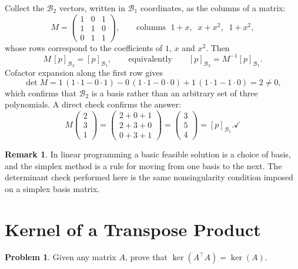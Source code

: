 \documentclass[11pt]{article}
\theoremstyle{definition}
\newtheorem{problem}{Problem}
\newtheorem*{remark}{Remark}
\begin{document}
Collect the $\mathcal{B}_2$ vectors, written in $\mathcal{B}_1$
coordinates, as the columns of a matrix:
\[
  M =
  \begin{pmatrix}
    1 & 0 & 1 \\
    1 & 1 & 0 \\
    0 & 1 & 1
  \end{pmatrix},
  \qquad
  \text{columns } \;1+x,\;\; x+x^2,\;\; 1+x^2 ,
\]
whose rows correspond to the coefficients of $1$, $x$ and $x^2$. Then
\[
  M \, [p]_{\mathcal{B}_2} = [p]_{\mathcal{B}_1},
  \qquad\text{equivalently}\qquad
  [p]_{\mathcal{B}_2} = M^{-1} [p]_{\mathcal{B}_1}.
\]
Cofactor expansion along the first row gives
\[
  \det M = 1\,(1\cdot 1 - 0\cdot 1) - 0\,(1\cdot 1 - 0\cdot 0)
         + 1\,(1\cdot 1 - 1\cdot 0) = 2 \neq 0 ,
\]
which confirms that $\mathcal{B}_2$ is a basis rather than an arbitrary
set of three polynomials. A direct check confirms the answer:
\[
  M \begin{pmatrix} 2 \\ 3 \\ 1 \end{pmatrix}
  = \begin{pmatrix} 2 + 0 + 1 \\ 2 + 3 + 0 \\ 0 + 3 + 1 \end{pmatrix}
  = \begin{pmatrix} 3 \\ 5 \\ 4 \end{pmatrix}
  = [p]_{\mathcal{B}_1}. \checkmark
\]

\begin{remark}
In linear programming a basic feasible solution is a choice of basis, and
the simplex method is a rule for moving from one basis to the next. The
determinant check performed here is the same nonsingularity condition
imposed on a simplex basis matrix.
\end{remark}

\section{Kernel of a Transpose Product}

\begin{problem}
Given any matrix $A$, prove that $\ker(A^{\top}\!A) = \ker(A)$.
\end{problem}
\end{document}
